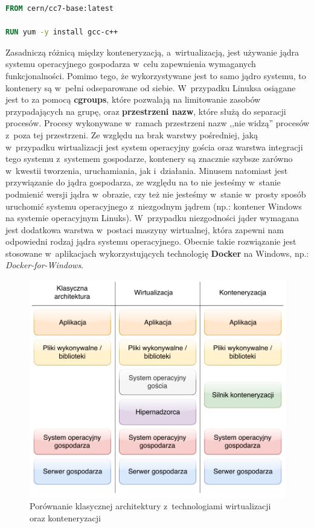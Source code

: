 \begin{lstlisting}[label={lis:dockerfile}, language=Dockerfile, caption={Przykładowy Dockerfile}]
FROM cern/cc7-base:latest

RUN yum -y install gcc-c++
\end{lstlisting}

Zasadniczą różnicą między konteneryzacją, a~wirtualizacją, jest używanie jądra systemu operacyjnego gospodarza w~celu zapewnienia wymaganych funkcjonalności. Pomimo tego, że wykorzystywane jest to samo jądro systemu, to kontenery są w~pełni odseparowane od siebie. W~przypadku Linuksa osiągane jest to za pomocą \textbf{cgroups}, które pozwalają na limitowanie zasobów przypadających na grupę, oraz \textbf{przestrzeni nazw}, które służą do separacji procesów. Procesy wykonywane w~ramach przestrzeni nazw ,,nie widzą'' procesów z~poza tej przestrzeni. Ze względu na brak warstwy pośredniej, jaką w~przypadku wirtualizacji jest system operacyjny gościa oraz warstwa integracji tego systemu z~systemem gospodarze, kontenery są znacznie szybsze zarówno w~kwestii tworzenia, uruchamiania, jak i~działania. Minusem natomiast jest przywiązanie do jądra gospodarza, ze względu na to nie jesteśmy w~stanie podmienić wersji jądra w~obrazie, czy też nie jesteśmy w~stanie w~prosty sposób uruchomić systemu operacyjnego z~niezgodnym jądrem (np.: kontener Windows na systemie operacyjnym Linuks). W~przypadku niezgodności jąder wymagana jest dodatkowa warstwa w~postaci maszyny wirtualnej, która zapewni nam odpowiedni rodzaj jądra systemu operacyjnego. Obecnie takie rozwiązanie jest stosowane w~aplikacjach wykorzystujących technologię \textbf{Docker} na Windows, np.: \textit{Docker-for-Windows}. \cite{Kont2} \cite{Kont3}

\begin{figure} [H]
\centering
\includegraphics[width=\textwidth]{res/virtualizationAndContenerizatrionComparison}
\caption{Porównanie klasycznej architektury z~technologiami wirtualizacji oraz konteneryzacji \cite{Kont4}}
\end{figure}